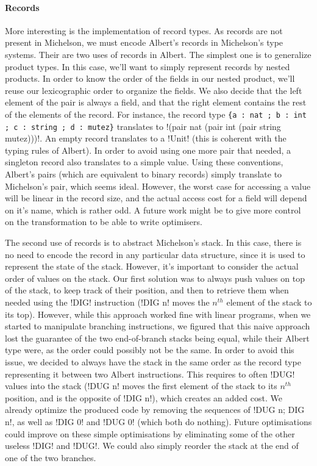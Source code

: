 \documentclass{report}
\begin{document}
\paragraph{Records}
More interesting is the implementation of record types. As records are not present in Michelson, we must encode Albert's records in Michelson's type systems. Their are two uses of records in Albert. The simplest one is to generalize product types. In this case, we'll want to simply represent records by nested products. In order to know the order of the fields in our nested product, we'll reuse our lexicographic order to organize the fields. We also decide that the left element of the pair is always a field, and that the right element contains the rest of the elements of the record. For instance, the record type \lstinline|{a : nat ; b : int ; c : string ; d : mutez}| translates to !(pair nat (pair int (pair string mutez)))!. An empty record translates to a !Unit! (this is coherent with the typing rules of Albert). In order to avoid using one more pair that needed, a singleton record also translates to a simple value. Using these conventions, Albert's pairs (which are equivalent to binary records) simply translate to Michelson's pair, which seems ideal. However, the worst case for accessing a value will  be linear in the record size, and the actual access cost for a field will depend on it's name, which is rather odd. A future work might be to give more control on the transformation to be able to write optimisers.

The second use of records is to abstract Michelson's stack. In this case, there is no need to encode the record in any particular data structure, since it is used to represent the state of the stack. However, it's important to consider the actual order of values on the stack. Our first solution was to always push values on top of the stack, to keep track of their position, and then to retrieve them when needed using the !DIG! instruction (!DIG n! moves the $n^{th}$ element of the stack to its top). However, while this approach worked fine with linear programs, when we started to manipulate branching instructions, we figured that this naive approach lost the guarantee of the two end-of-branch stacks being equal, while their Albert type were, as the order could possibly not be the same. In order to avoid this issue, we decided to always have the stack in the same order as the record type representing it between two Albert instructions. This requires to often !DUG! values into the stack (!DUG n! moves the first element of the stack to its $n^{th}$ position, and is the opposite of !DIG n!), which creates an added cost. We already optimize the produced code by removing the sequences of !DUG n; DIG n!, as well as !DIG 0! and !DUG 0! (which both do nothing). Future optimisations could improve on these simple optimisations by eliminating some of the other useless !DIG! and !DUG!. We could also simply reorder the stack at the end of one of the two branches.
\end{document}
